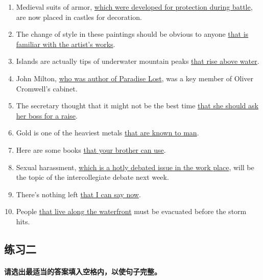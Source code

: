 \begin{enumerate}

\item Medieval suits of armor, \ul{which were developed for protection during
battle}, are now placed in castles for decoration.

\item The change of style in these paintings should be obvious to anyone
\ul{that is familiar with the artist's works}.

\item Islands are actually tips of underwater mountain peaks \ul{that rise above
  water}.

\item John Milton, \ul{who was author of Paradise Lost}, was a key member of
Oliver Cromwell's cabinet.

\item The secretary thought that it might not be the best time \ul{that she
should ask her boss for a raise}.

\item Gold is one of the heaviest metals \ul{that are known to man}.

\item Here are some books \ul{that your brother can use}.

\item Sexual harassment, \ul{which is a hotly debated issue in the work place}, will
  be the topic of the intercollegiate debate next week.

\item There's nothing left \ul{that I can say now}.

\item People \ul{that live along the waterfront} must be evacuated before the storm
  hits.

\end{enumerate}

\subsection{练习二}

\paragraph{请选出最适当的答案填入空格内，以使句子完整。}

